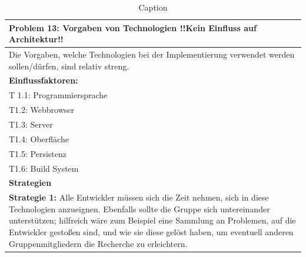\documentclass[enabledeprecatedfontcommands,fontsize=12pt,paper=a4,twoside]{scrartcl}
\begin{document}
\begin{table}[H]
    \centering
    \begin{tabular}{|p{15cm}|}
    \hline
          \textbf{Problem 13:} Vorgaben von Technologien !!Kein Einfluss auf Architektur!!
          \\ \hline
          Die Vorgaben, welche Technologien bei der Implementierung verwendet werden sollen/dürfen, sind relativ streng.
          \\ \hline
          \textbf{Einflussfaktoren: } \\
          T 1.1: Programmiersprache \\
          T1.2: Webbrowser \\
          T1.3: Server \\
          T1.4: Oberfläche \\
          T1.5: Persistenz \\
          T1.6: Build System \\
          \hline
          \textbf{Strategien} \\ \hline
          \textbf{Strategie 1:} Alle Entwickler müssen sich die Zeit nehmen, sich in diese Technologien anzueignen. Ebenfalls sollte die Gruppe sich untereinander unterstützen; hilfreich wäre zum Beispiel eine Sammlung an Problemen, auf die Entwickler gestoßen sind, und wie sie diese gelöst haben, um eventuell anderen Gruppenmitgliedern die Recherche zu erleichtern.
          \\ \hline
    \end{tabular}
    \caption{Caption}
    \label{tab:my_label}
\end{table}
\end{document}
